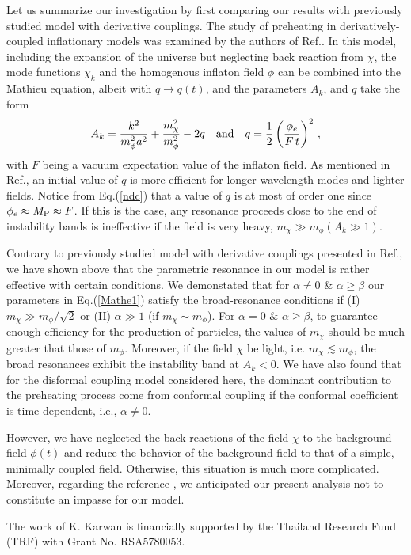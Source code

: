 \documentclass[aps,prd,amsmath,amssymb,preprintnumbers,onecolumn,11pt,nofootinbib]{revtex4}
\begin{document}
Let us summarize our investigation by first comparing our results with previously studied model with derivative couplings. The study of preheating in derivatively-coupled inflationary models was examined by the authors of Ref.\cite{ArmendarizPicon:2007iv}. In this model, including the expansion of the universe but neglecting back reaction from $\chi$, the mode functions $\chi_{k}$ and the homogenous inflaton field $\phi$ can be combined into the Mathieu equation, albeit with $q\rightarrow q(t)$, and the parameters $A_{k}$, and $q$ take the form
\begin{eqnarray}
A_{k} = \frac{k^{2}}{m^{2}_{\phi}a^{2}} + \frac{m^{2}_{\chi}}{m^{2}_{\phi}} -2q \quad{\rm and}\quad q = \frac{1}{2}\left(\frac{\phi_{e}}{F\,t}\right)^{2}\,,\label{ndc}
\end{eqnarray}
with $F$ being a vacuum expectation value of the inflaton field. As mentioned in Ref.\cite{ArmendarizPicon:2007iv}, an initial value of $q$ is more efficient for longer wavelength modes and lighter fields. Notice from Eq.(\ref{ndc}) that a value of $q$ is at most of order one since $\phi_{e} \approx M_{\rm P} \approx F$. If this is the case, any resonance proceeds close to the end of instability bands is ineffective if the field is very heavy, $m_{\chi}\gg m_{\phi} (A_{k}\gg 1)$. 

Contrary to previously studied model with derivative couplings presented in Ref.\cite{ArmendarizPicon:2007iv}, we have shown above that the parametric resonance in our model is rather effective with certain conditions.  We demonstated that for $\alpha\neq 0\,\,\&\,\,\alpha\geq \beta$ our parameters in Eq.(\ref{Mathe1}) satisfy the broad-resonance conditions if (I) $m_{\chi}\gg m_{\phi}/\sqrt{2}$ or (II) $\alpha\gg 1$ (if $m_{\chi}\sim m_{\phi}$). For $\alpha=0\,\,\&\,\,\alpha\geq \beta$, to guarantee enough efficiency for the production of particles, the values of $m_{\chi}$ should be much greater that those of $m_{\phi}$. Moreover, if the field $\chi$ be light, i.e. $m_{\chi} \lesssim m_{\phi}$, the broad resonances exhibit the instability band at $A_{k} <0$. We have also found that for the disformal coupling model considered here,
the dominant contribution to the preheating process come from conformal coupling if the conformal coefficient is time-dependent, i.e., $\alpha \neq 0$.

However, we have neglected the back reactions of the field $\chi$ to the background field $\phi (t)$ and reduce the behavior of the background field to that of a simple, minimally coupled field. Otherwise, this situation is much more complicated.  Moreover, regarding the reference \cite{ArmendarizPicon:2007iv,Tsujikawa:1999iv}, we anticipated our present analysis not to constitute an impasse for our model.

\acknowledgments
The work of K. Karwan is financially supported by the Thailand Research Fund (TRF) with Grant No. RSA5780053.
\end{document}
